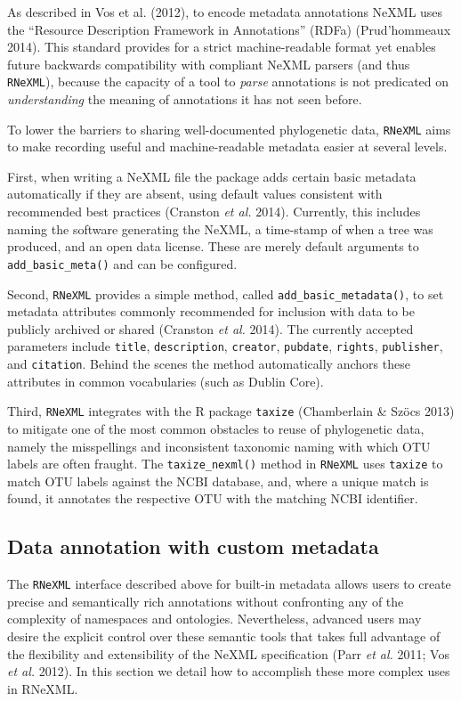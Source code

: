 \documentclass[author-year, review, 11pt]{components/elsarticle} %
\begin{document}
As described in Vos et al. (2012), to encode metadata annotations NeXML
uses the ``Resource Description Framework in Annotations'' (RDFa)
(Prud'hommeaux 2014). This standard provides for a strict
machine-readable format yet enables future backwards compatibility with
compliant NeXML parsers (and thus \texttt{RNeXML}), because the capacity
of a tool to \emph{parse} annotations is not predicated on
\emph{understanding} the meaning of annotations it has not seen before.

To lower the barriers to sharing well-documented phylogenetic data,
\texttt{RNeXML} aims to make recording useful and machine-readable
metadata easier at several levels.

First, when writing a NeXML file the package adds certain basic metadata
automatically if they are absent, using default values consistent with
recommended best practices (Cranston \emph{et al.} 2014). Currently,
this includes naming the software generating the NeXML, a time-stamp of
when a tree was produced, and an open data license. These are merely
default arguments to \texttt{add\_basic\_meta()} and can be configured.

Second, \texttt{RNeXML} provides a simple method, called
\texttt{add\_basic\_metadata()}, to set metadata attributes commonly
recommended for inclusion with data to be publicly archived or shared
(Cranston \emph{et al.} 2014). The currently accepted parameters include
\texttt{title}, \texttt{description}, \texttt{creator},
\texttt{pubdate}, \texttt{rights}, \texttt{publisher}, and
\texttt{citation}. Behind the scenes the method automatically anchors
these attributes in common vocabularies (such as Dublin Core).

Third, \texttt{RNeXML} integrates with the R package \texttt{taxize}
(Chamberlain \& Sz{ö}cs 2013) to mitigate one of the most common
obstacles to reuse of phylogenetic data, namely the misspellings and
inconsistent taxonomic naming with which OTU labels are often fraught.
The \texttt{taxize\_nexml()} method in \texttt{RNeXML} uses
\texttt{taxize} to match OTU labels against the NCBI database, and,
where a unique match is found, it annotates the respective OTU with the
matching NCBI identifier.

\subsection{Data annotation with custom
metadata}\label{data-annotation-with-custom-metadata}

The \texttt{RNeXML} interface described above for built-in metadata
allows users to create precise and semantically rich annotations without
confronting any of the complexity of namespaces and ontologies.
Nevertheless, advanced users may desire the explicit control over these
semantic tools that takes full advantage of the flexibility and
extensibility of the NeXML specification (Parr \emph{et al.} 2011; Vos
\emph{et al.} 2012). In this section we detail how to accomplish these
more complex uses in RNeXML.
\end{document}
